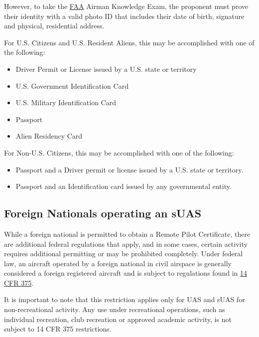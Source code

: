 \documentclass[
]{book}
\providecommand{\tightlist}{%
  \setlength{\itemsep}{0pt}\setlength{\parskip}{0pt}}
\begin{document}
However, to take the \protect\hyperlink{FAA}{FAA} Airman Knowledge Exam, the proponent must prove their identity with a valid photo ID that includes their date of birth, signature and physical, residential address.

For U.S. Citizens and U.S. Resident Aliens, this may be accomplished with one of the following:

\begin{itemize}
\tightlist
\item
  Driver Permit or License issued by a U.S. state or territory
\item
  U.S. Government Identification Card
\item
  U.S. Military Identification Card
\item
  Passport
\item
  Alien Residency Card
\end{itemize}

For Non-U.S. Citizens, this may be accomplished with one of the following:

\begin{itemize}
\tightlist
\item
  Passport and a Driver permit or license issued by a U.S. state or territory.
\item
  Passport and an Identification card issued by any governmental entity.
\end{itemize}

\hypertarget{foreign-nationals-operating-an-suas}{%
\subsection{Foreign Nationals operating an sUAS}\label{foreign-nationals-operating-an-suas}}

While a foreign national is permitted to obtain a Remote Pilot Certificate, there are additional federal regulations that apply, and in some cases, certain activity requires additional permitting or may be prohibited completely. Under federal law, an aircraft operated by a foreign national in civil airspace is generally considered a foreign registered aircraft and is subject to regulations found in \href{https://www.faa.gov/uas/resources/foreign_operators/}{14 CFR 375}.

It is important to note that this restriction applies only for UAS and sUAS for non-recreational activity. Any use under recreational operations, such as individual recreation, club recreation or approved academic activity, is not subject to 14 CFR 375 restrictions.
\end{document}

